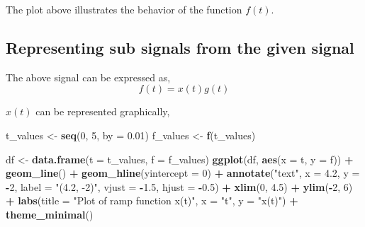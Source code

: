 \documentclass[
]{article}
\newenvironment{Shaded}{\begin{snugshade}}{\end{snugshade}}
\newcommand{\AttributeTok}[1]{\textcolor[rgb]{0.13,0.29,0.53}{#1}}
\newcommand{\DecValTok}[1]{\textcolor[rgb]{0.00,0.00,0.81}{#1}}
\newcommand{\FloatTok}[1]{\textcolor[rgb]{0.00,0.00,0.81}{#1}}
\newcommand{\FunctionTok}[1]{\textcolor[rgb]{0.13,0.29,0.53}{\textbf{#1}}}
\newcommand{\NormalTok}[1]{#1}
\newcommand{\OtherTok}[1]{\textcolor[rgb]{0.56,0.35,0.01}{#1}}
\newcommand{\SpecialCharTok}[1]{\textcolor[rgb]{0.81,0.36,0.00}{\textbf{#1}}}
\newcommand{\StringTok}[1]{\textcolor[rgb]{0.31,0.60,0.02}{#1}}
\begin{document}
The plot above illustrates the behavior of the function \(f(t)\).

\hypertarget{representing-sub-signals-from-the-given-signal}{%
\subsection{Representing sub signals from the given
signal}\label{representing-sub-signals-from-the-given-signal}}

The above signal can be expressed as, \[f(t) = x(t)g(t)\]

\(x(t)\) can be represented graphically,

\begin{Shaded}
\begin{Highlighting}[]
\NormalTok{t\_values }\OtherTok{\textless{}{-}} \FunctionTok{seq}\NormalTok{(}\DecValTok{0}\NormalTok{, }\DecValTok{5}\NormalTok{, }\AttributeTok{by =} \FloatTok{0.01}\NormalTok{)}
\NormalTok{f\_values }\OtherTok{\textless{}{-}} \FunctionTok{f}\NormalTok{(t\_values)}

\NormalTok{df }\OtherTok{\textless{}{-}} \FunctionTok{data.frame}\NormalTok{(}\AttributeTok{t =}\NormalTok{ t\_values, }\AttributeTok{f =}\NormalTok{ f\_values)}
\FunctionTok{ggplot}\NormalTok{(df, }\FunctionTok{aes}\NormalTok{(}\AttributeTok{x =}\NormalTok{ t, }\AttributeTok{y =}\NormalTok{ f)) }\SpecialCharTok{+}
  \FunctionTok{geom\_line}\NormalTok{() }\SpecialCharTok{+}
  \FunctionTok{geom\_hline}\NormalTok{(}\AttributeTok{yintercept =} \DecValTok{0}\NormalTok{) }\SpecialCharTok{+}  
  \FunctionTok{annotate}\NormalTok{(}\StringTok{"text"}\NormalTok{, }\AttributeTok{x =} \FloatTok{4.2}\NormalTok{, }\AttributeTok{y =} \SpecialCharTok{{-}}\DecValTok{2}\NormalTok{, }\AttributeTok{label =} \StringTok{"(4.2, {-}2)"}\NormalTok{, }\AttributeTok{vjust =} \SpecialCharTok{{-}}\FloatTok{1.5}\NormalTok{, }\AttributeTok{hjust =} \SpecialCharTok{{-}}\FloatTok{0.5}\NormalTok{) }\SpecialCharTok{+}  
  \FunctionTok{xlim}\NormalTok{(}\DecValTok{0}\NormalTok{, }\FloatTok{4.5}\NormalTok{) }\SpecialCharTok{+} 
  \FunctionTok{ylim}\NormalTok{(}\SpecialCharTok{{-}}\DecValTok{2}\NormalTok{, }\DecValTok{6}\NormalTok{) }\SpecialCharTok{+} 
  \FunctionTok{labs}\NormalTok{(}\AttributeTok{title =} \StringTok{"Plot of ramp function x(t)"}\NormalTok{, }\AttributeTok{x =} \StringTok{"t"}\NormalTok{, }\AttributeTok{y =} \StringTok{"x(t)"}\NormalTok{) }\SpecialCharTok{+}
  \FunctionTok{theme\_minimal}\NormalTok{()}
\end{Highlighting}
\end{Shaded}
\end{document}
